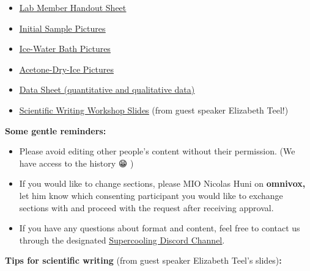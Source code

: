 \begin{itemize}
\item
  \href{https://docs.google.com/document/d/1_lrn-yNQTnDbAu8eqkT399SBtqj81q0VHHypbD5RuBQ/edit?usp=sharing}{\ul{Lab
  Member Handout Sheet}}
\item
  \href{https://drive.google.com/drive/folders/1HfUY64YCwoHetagSDpJOahoH-zSswrbs?usp=drive_link}{\ul{Initial
  Sample Pictures}}
\item
  \href{https://drive.google.com/drive/folders/1YSVa-CDu4g39CmCwvr0QcoKk0oyX-Gw9?usp=drive_link}{\ul{Ice-Water
  Bath Pictures}}
\item
  \href{https://drive.google.com/drive/folders/1hbAqyZgXMqdLH1_UBrjk5hroIpjT1320?usp=drive_link}{\ul{Acetone-Dry-Ice
  Pictures}}
\item
  \href{https://drive.google.com/drive/folders/1ZHALieRmtOkKvx9nMNw6_dSi68EbCrts?usp=drive_link}{\ul{Data
  Sheet (quantitative and qualitative data)}}
\item
  \href{https://drive.google.com/file/d/1pMFC6koPDrH5SM0JLRMNXgy3zwWQ-KXk/view?usp=sharing}{\ul{Scientific
  Writing Workshop Slides}} (from guest speaker Elizabeth Teel!)
\end{itemize}

\textbf{Some gentle reminders:}

\begin{itemize}
\item
  Please avoid editing other people's content without their permission.
  (We have access to the history 😁 )
\item
  If you would like to change sections, please MIO Nicolas Huni on
  \textbf{omnivox,} let him know which consenting participant you would
  like to exchange sections with and proceed with the request after
  receiving approval.
\item
  If you have any questions about format and content, feel free to
  contact us through the designated
  \href{https://discord.gg/PJDX7c8V}{\ul{Supercooling Discord Channel}}.
\end{itemize}

\textbf{Tips for scientific writing} (from guest speaker Elizabeth
Teel's slides)\textbf{:}

